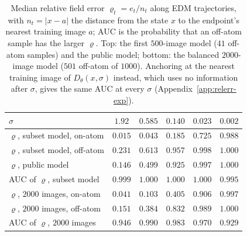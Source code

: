 \documentclass{article} %
\theoremstyle{plain}
\theoremstyle{definition}
\theoremstyle{remark}
\begin{document}
\begin{table}[t]
\centering\small
\begin{tabular}{@{}lccccc@{}}
\toprule
$\sigma$ & $1.92$ & $0.585$ & $0.140$ & $0.023$ & $0.002$\\
\midrule
$\varrho$, subset model, on-atom & $0.015$ & $0.043$ & $0.185$ & $0.725$ & $0.988$\\
$\varrho$, subset model, off-atom & $0.231$ & $0.613$ & $0.957$ & $0.998$ & $1.000$\\
$\varrho$, public model & $0.146$ & $0.499$ & $0.925$ & $0.997$ & $1.000$\\
AUC of $\varrho$, subset model & $0.999$ & $1.000$ & $1.000$ & $1.000$ & $0.995$\\
\midrule
$\varrho$, $2000$ images, on-atom & $0.041$ & $0.103$ & $0.405$ & $0.906$ & $0.997$\\
$\varrho$, $2000$ images, off-atom & $0.151$ & $0.384$ & $0.832$ & $0.989$ & $1.000$\\
AUC of $\varrho$, $2000$ images & $0.946$ & $0.990$ & $0.983$ & $0.970$ & $0.929$\\
\bottomrule
\end{tabular}
\caption{Median relative field error $\varrho_t=e_t/n_t$ along EDM trajectories, with $n_t=|x-a|$
the distance from the state $x$ to the endpoint's nearest training image $a$; AUC is the probability that an off-atom
sample has the larger $\varrho$. Top: the first $500$-image model ($41$ off-atom samples) and the
public model; bottom: the balanced $2000$-image model ($501$ off-atom of $1000$). Anchoring at the
nearest training image of $D_\theta(x,\sigma)$ instead, which uses no information after $\sigma$,
gives the same AUC at every $\sigma$ (Appendix~\ref{app:relerr-exp}).}
\label{tab:edm-rho}
\end{table}
\end{document}
